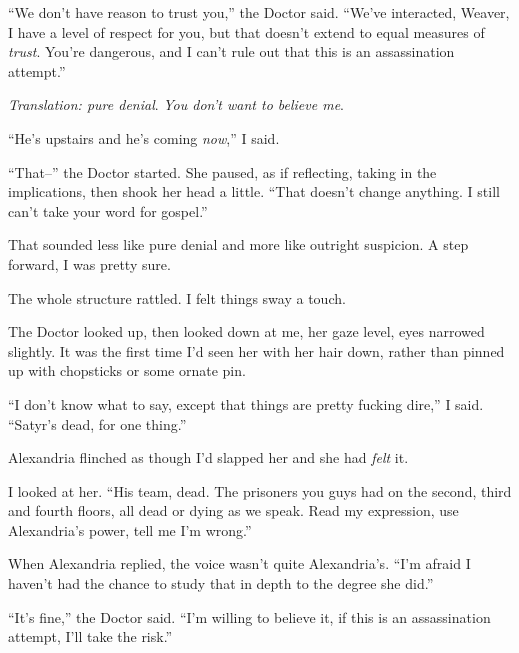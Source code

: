 ``We don't have reason to trust you,'' the Doctor said.  ``We've interacted, Weaver, I have a level of respect for you, but that doesn't extend to equal measures of \emph{trust}.  You're dangerous, and I can't rule out that this is an assassination attempt.''



\emph{Translation: pure denial}.  \emph{You don't want to believe me}.



``He's upstairs and he's coming \emph{now},'' I said.



``That--'' the Doctor started.  She paused, as if reflecting, taking in the implications, then shook her head a little.  ``That doesn't change anything.  I still can't take your word for gospel.''



That sounded less like pure denial and more like outright suspicion.  A step forward, I was pretty sure.



The whole structure rattled.  I felt things sway a touch.



The Doctor looked up, then looked down at me, her gaze level, eyes narrowed slightly.  It was the first time I'd seen her with her hair down, rather than pinned up with chopsticks or some ornate pin.



``I don't know what to say, except that things are pretty fucking dire,'' I said.  ``Satyr's dead, for one thing.''



Alexandria flinched as though I'd slapped her and she had \emph{felt} it.



I looked at her.  ``His team, dead.  The prisoners you guys had on the second, third and fourth floors, all dead or dying as we speak.  Read my expression, use Alexandria's power, tell me I'm wrong.''



When Alexandria replied, the voice wasn't quite Alexandria's.  ``I'm afraid I haven't had the chance to study that in depth to the degree she did.''



``It's fine,'' the Doctor said.  ``I'm willing to believe it, if this is an assassination attempt, I'll take the risk.''



